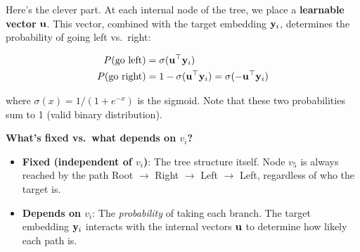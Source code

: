 \begin{notechapter}
Here's the clever part. At each internal node of the tree, we place a \textbf{learnable vector} $\mathbf{u}$. This vector, combined with the target embedding $\mathbf{y}_i$, determines the probability of going left vs.\ right:

\begin{align*}
P(\text{go left}) &= \sigma(\mathbf{u}^\top \mathbf{y}_i) \\
P(\text{go right}) &= 1 - \sigma(\mathbf{u}^\top \mathbf{y}_i) = \sigma(-\mathbf{u}^\top \mathbf{y}_i)
\end{align*}

where $\sigma(x) = 1/(1+e^{-x})$ is the sigmoid. Note that these two probabilities sum to 1 (valid binary distribution).

\begin{center}
\end{center}

\begin{intuition}
\textbf{What's fixed vs.\ what depends on $v_i$?}

\begin{itemize}
    \item \textbf{Fixed (independent of $v_i$)}: The tree structure itself. Node $v_5$ is always reached by the path Root $\to$ Right $\to$ Left $\to$ Left, regardless of who the target is.
    
    \item \textbf{Depends on $v_i$}: The \emph{probability} of taking each branch. The target embedding $\mathbf{y}_i$ interacts with the internal vectors $\mathbf{u}$ to determine how likely each path is.
\end{itemize}


\end{intuition}
\end{notechapter}

